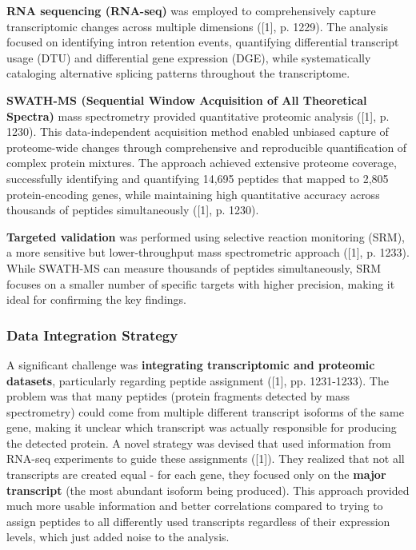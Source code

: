 \documentclass[12pt,a4paper]{article}
\begin{document}
\textbf{RNA sequencing (RNA-seq)} was employed to comprehensively capture transcriptomic changes across multiple dimensions ([1], p. 1229). The analysis focused on identifying intron retention events, quantifying differential transcript usage (DTU) and differential gene expression (DGE), while systematically cataloging alternative splicing patterns throughout the transcriptome.

\textbf{SWATH-MS (Sequential Window Acquisition of All Theoretical Spectra)} mass spectrometry provided quantitative proteomic analysis ([1], p. 1230). This data-independent acquisition method enabled unbiased capture of proteome-wide changes through comprehensive and reproducible quantification of complex protein mixtures. The approach achieved extensive proteome coverage, successfully identifying and quantifying 14,695 peptides that mapped to 2,805 protein-encoding genes, while maintaining high quantitative accuracy across thousands of peptides simultaneously ([1], p. 1230).

\textbf{Targeted validation} was performed using selective reaction monitoring (SRM), a more sensitive but lower-throughput mass spectrometric approach ([1], p. 1233). While SWATH-MS can measure thousands of peptides simultaneously, SRM focuses on a smaller number of specific targets with higher precision, making it ideal for confirming the key findings.

\subsubsection{Data Integration Strategy}

A significant challenge was \textbf{integrating transcriptomic and proteomic datasets}, particularly regarding peptide assignment ([1], pp. 1231-1233). The problem was that many peptides (protein fragments detected by mass spectrometry) could come from multiple different transcript isoforms of the same gene, making it unclear which transcript was actually responsible for producing the detected protein. A novel strategy was devised that used information from RNA-seq experiments to guide these assignments ([1]). They realized that not all transcripts are created equal - for each gene, they focused only on the \textbf{major transcript} (the most abundant isoform being produced). This approach provided much more usable information and better correlations compared to trying to assign peptides to all differently used transcripts regardless of their expression levels, which just added noise to the analysis.
\end{document}
